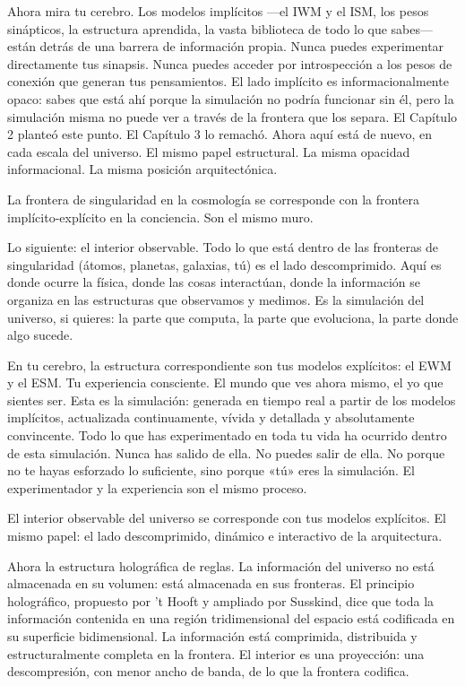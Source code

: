 \documentclass[11pt, twoside, openright]{book}
\begin{document}
Ahora mira tu cerebro. Los modelos implícitos ---el IWM y el ISM, los pesos sinápticos, la estructura aprendida, la vasta biblioteca de todo lo que sabes--- están detrás de una barrera de información propia. Nunca puedes experimentar directamente tus sinapsis. Nunca puedes acceder por introspección a los pesos de conexión que generan tus pensamientos. El lado implícito es informacionalmente opaco: sabes que está ahí porque la simulación no podría funcionar sin él, pero la simulación misma no puede ver a través de la frontera que los separa. El Capítulo 2 planteó este punto. El Capítulo 3 lo remachó. Ahora aquí está de nuevo, en cada escala del universo. El mismo papel estructural. La misma opacidad informacional. La misma posición arquitectónica.

La frontera de singularidad en la cosmología se corresponde con la frontera implícito-explícito en la conciencia. Son el mismo muro.

Lo siguiente: el interior observable. Todo lo que está dentro de las fronteras de singularidad (átomos, planetas, galaxias, tú) es el lado descomprimido. Aquí es donde ocurre la física, donde las cosas interactúan, donde la información se organiza en las estructuras que observamos y medimos. Es la simulación del universo, si quieres: la parte que computa, la parte que evoluciona, la parte donde algo sucede.

En tu cerebro, la estructura correspondiente son tus modelos explícitos: el EWM y el ESM. Tu experiencia consciente. El mundo que ves ahora mismo, el yo que sientes ser. Esta es la simulación: generada en tiempo real a partir de los modelos implícitos, actualizada continuamente, vívida y detallada y absolutamente convincente. Todo lo que has experimentado en toda tu vida ha ocurrido dentro de esta simulación. Nunca has salido de ella. No puedes salir de ella. No porque no te hayas esforzado lo suficiente, sino porque «tú» eres la simulación. El experimentador y la experiencia son el mismo proceso.

El interior observable del universo se corresponde con tus modelos explícitos. El mismo papel: el lado descomprimido, dinámico e interactivo de la arquitectura.

Ahora la estructura holográfica de reglas. La información del universo no está almacenada en su volumen: está almacenada en sus fronteras. El principio holográfico, propuesto por 't Hooft y ampliado por Susskind, dice que toda la información contenida en una región tridimensional del espacio está codificada en su superficie bidimensional. La información está comprimida, distribuida y estructuralmente completa en la frontera. El interior es una proyección: una descompresión, con menor ancho de banda, de lo que la frontera codifica.
\end{document}
